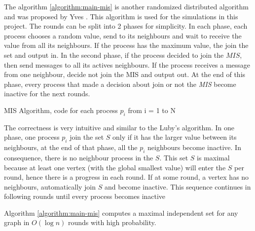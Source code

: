 The algorithm \ref{algorithm:main-mis} is another randomized distributed algorithm and was proposed by Yves \cite{yves2009optimal}. This algorithm is used for the simulations in this project. The rounds can be split into 2 phases for simplicity. In each phase, each process chooses a random value, send to its neighbours and wait to receive the value from all its neighbours. If the process has the maximum value, the join the set and output in. In the second phase, if the process decided to join the $MIS$, then send messages to all its actives neighbours. If the process receives a message from one neighbour, decide not join the MIS and output out. At the end of this phase, every process that made a decision about join or not the \textit{MIS} become inactive for the next rounds.

\begin{algorithm}
 \caption{MIS Algorithm, code for each process $p_i$ from i = 1 to N}
 \label{algorithm:main-mis} 

\SetAlgoNoLine
{}
\end{algorithm}


The correctness is very intuitive and similar to the Luby's algorithm. In one phase, one process $p_i$ join the set $S$ only if it has the larger value between its neighbours, at the end of that phase, all the $p_i$ neighbours become inactive. In consequence, there is no neighbour process in the $S$. This set $S$ is maximal because at least one vertex (with the global smallest value) will enter the $S$ per round, hence there is a progress in each round. If at some round, a vertex has no neighbours, automatically join $S$ and become inactive. This sequence continues in following rounds until every process becomes inactive

\begin{theorem}

Algorithm \ref{algorithm:main-mis} computes a maximal independent set for any graph in $O(\log n)$ rounds with high probability.

\end{theorem}




\newpage
